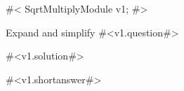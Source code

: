 

#<
SqrtMultiplyModule v1;
#>

Expand and simplify #<v1.question#>

#<v1.solution#>

#<v1.shortanswer#>


